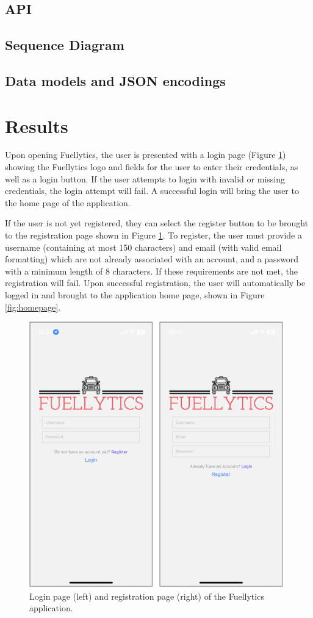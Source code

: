 \documentclass[11pt, oneside]{article}
\begin{document}
\subsection{API}

\subsection{Sequence Diagram}

\subsection{Data models and JSON encodings}

\section{Results}
Upon opening Fuellytics, the user is presented with a login page (Figure \ref*{fig:login-register}) showing the Fuellytics logo and fields for the user to enter their credentials, as well as a login button. If the user attempts to login with invalid or missing credentials, the login attempt will fail.  A successful login will bring the user to the home page of the application.

If the user is not yet registered, they can select the register button to be brought to the registration page shown in Figure \ref*{fig:login-register}.  To register, the user must provide a username (containing at most 150 characters) and email (with valid email formatting) which are not already associated with an account, and a password with a minimum length of 8 characters.  If these requirements are not met, the registration will fail. Upon successful registration, the user will automatically be logged in and brought to the application home page, shown in Figure \ref*{fig:homepage}.
\begin{figure}[H]
\centerline{\includegraphics[width=11cm]{img/login-register.png}}
\caption{\label{fig:login-register} Login page (left) and registration page (right) of the Fuellytics application.}
\end{figure}
\end{document}
